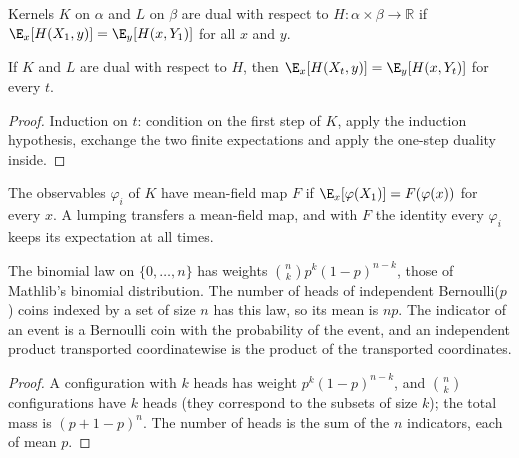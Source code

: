 \begin{definition}[Duality]\label{def:dual}
\leanok{}
Kernels $K$ on $\alpha$ and $L$ on $\beta$ are dual with respect to $H:\alpha\times\beta\to\mathbb R$
if $\E_x[H(X_1,y)]=\E_y[H(x,Y_1)]$ for all $x$ and $y$.
\end{definition}
\begin{lemma}\label{lem:dual}
\leanok{}
If $K$ and $L$ are dual with respect to $H$, then $\E_x[H(X_t,y)]=\E_y[H(x,Y_t)]$ for every $t$.
\end{lemma}
\begin{proof}\leanok
Induction on $t$: condition on the first step of $K$, apply the induction hypothesis, exchange the
two finite expectations and apply the one-step duality inside.
\end{proof}
\begin{definition}\label{def:meanfield}
\leanok{}
The observables $\varphi_i$ of $K$ have mean-field map $F$ if $\E_x[\varphi(X_1)]=F(\varphi(x))$
for every $x$. A lumping transfers a mean-field map, and with $F$ the identity every $\varphi_i$
keeps its expectation at all times.
\end{definition}
\begin{lemma}\label{lem:binomial}
\leanok{}
The binomial law on $\{0,\dots,n\}$ has weights $\binom nk p^k(1-p)^{n-k}$, those of Mathlib's
binomial distribution. The number of heads of independent Bernoulli($p$) coins indexed by a set
of size $n$ has this law, so its mean is $np$. The indicator of an event is a Bernoulli coin with
the probability of the event, and an independent product transported coordinatewise is the
product of the transported coordinates.
\end{lemma}
\begin{proof}\leanok
A configuration with $k$ heads has weight $p^k(1-p)^{n-k}$, and $\binom nk$ configurations have
$k$ heads (they correspond to the subsets of size $k$); the total mass is $(p+1-p)^n$. The number
of heads is the sum of the $n$ indicators, each of mean $p$.
\end{proof}
